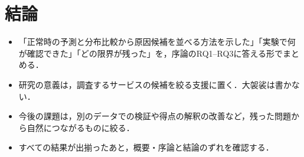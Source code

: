 \section{結論}
\label{sec:conclusion}
\begin{itemize}
    \item 「正常時の予測と分布比較から原因候補を並べる方法を示した」「実験で何が確認できた」「どの限界が残った」を，序論のRQ1--RQ3に答える形でまとめる．
    \item 研究の意義は，調査するサービスの候補を絞る支援に置く．大袈裟は書かない．
    \item 今後の課題は，別のデータでの検証や得点の解釈の改善など，残った問題から自然につながるものに絞る．
    \item すべての結果が出揃ったあと，概要・序論と結論のずれを確認する．
\end{itemize}

